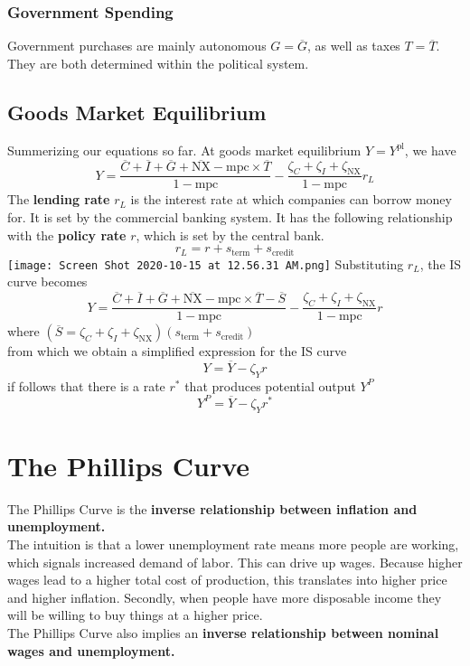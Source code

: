 \documentclass[a4paper]{article}
\begin{document}
\subsubsection*{Government Spending}
Government purchases are mainly autonomous $G = \overline{G}$, as well as
taxes $T = \overline{T}$. They are both determined within the political system.

\subsection{Goods Market Equilibrium}
Summerizing our equations so far. At goods market equilibrium 
$Y = Y^{\text{pl}}$, we have
\[ Y = \frac{\overline{C} + \overline{I} + \overline{G} + \overline{\text{NX}}
- \text{mpc} \times \overline{T}}{1 - \text{mpc}} - \frac{\zeta_C +
 \zeta_I + \zeta_{\text{NX}}}{1 - \text{mpc}}r_L \]
The \textbf{lending rate} $r_L$ is the interest rate at which companies 
can borrow money
for. It is set by the commercial banking system. It has the following 
relationship with the \textbf{policy rate} $r$, which is set by the central bank.
\[ r_L = r + s_{\text{term}} + s_{\text{credit}} \]
\texttt{[image: Screen Shot 2020-10-15 at 12.56.31 AM.png]}
Substituting $r_L$, the IS curve becomes
\[ Y = \frac{\overline{C} + \overline{I} + \overline{G} + \overline{\text{NX}}
- \text{mpc} \times \overline{T} - \overline{S}}{1 - \text{mpc}} - \frac{\zeta_C +
\zeta_I + \zeta_{\text{NX}}}{1 - \text{mpc}}r \]
where $(\overline{S} = \zeta_C + \zeta_I + \zeta_{\text{NX}})
(s_{\text{term}} + s_{\text{credit}})$
\smallskip \\
from which we obtain a simplified expression for the IS curve
\[ \boxed{Y = \overline{Y} - \zeta_Y r} \]
if follows that there is a rate $r^*$ that produces potential output $Y^P$
\[ Y^P = \overline{Y} - \zeta_Y r^* \]

\section{The Phillips Curve}
The Phillips Curve is the \textbf{inverse relationship between inflation
and unemployment.} \smallskip \\
The intuition is that a lower unemployment rate means more people are working,
which signals increased demand of labor. This can drive up wages.
Because higher wages lead to a higher total cost of production, this 
translates into higher price and higher inflation. Secondly, when people 
have more disposable income they will be willing to buy things 
at a higher price. \smallskip \\
The Phillips Curve also implies an \textbf{inverse relationship 
between nominal wages and unemployment.}
\end{document}
